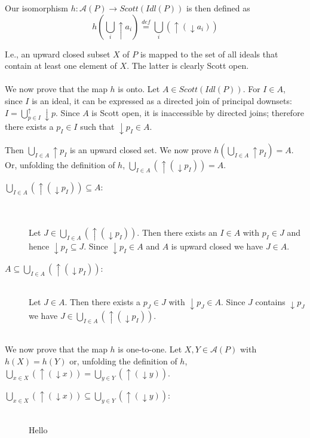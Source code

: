\documentclass{article}
\newcommand{\defeq}{\overset{\mathit{def}}{=}}
\begin{document}
Our isomorphism $h : \mathcal{A}(P) \to \mathit{Scott}(\mathit{Idl}(P))$ is then defined as
$$ h( \bigcup_i  \uparrow a_i ) \defeq \bigcup_i ( \uparrow (\downarrow a_i) )$$

I.e., an upward closed subset $X$ of $P$ is mapped to the set of all ideals that contain at least one element of $X$.
The latter is clearly Scott open.\\~\\
We now prove that the map $h$ is onto. Let $A \in \mathit{Scott}(\mathit{Idl}(P))$. For $I \in A$, since $I$ is an ideal, it can be expressed as a directed join of principal downsets: $I = \bigcup^{\uparrow}_{p \in I}\downarrow p$.
Since $A$ is Scott open, it is inaccessible by directed joins; therefore there exists a $p_I \in I$ such that 
$\downarrow p_I \in A$.  

Then $\bigcup_{I \in A} \uparrow p_I$ is an upward closed set. We now prove $h(\bigcup_{I \in A} \uparrow p_I)=A$. Or, unfolding the definition of $h$, $\bigcup_{I \in A} (\uparrow (\downarrow p_I) ) = A$. 

\begin{description}

\item[$\bigcup_{I \in A} (\uparrow (\downarrow p_I) ) \subseteq A$:]~\\~\\
Let $J \in \bigcup_{I \in A} (\uparrow (\downarrow p_I) )$. Then there exists an $I \in A$ with $p_I \in J$ and hence $\downarrow p_I \subseteq J$. Since $\downarrow p_I \in A$ and $A$ is upward closed we have $J \in A$.

\item[$A \subseteq \bigcup_{I \in A} (\uparrow (\downarrow p_I) )$:]~\\

Let $J \in A$. Then there exists a $p_J \in J$ with $\downarrow p_J \in A$. Since $J$ contains $\downarrow p_J$
we have $J \in \bigcup_{I \in A} (\uparrow (\downarrow p_I) )$.

\end{description}~\\
We now prove that the map $h$ is one-to-one. Let $X,Y \in \mathcal A(P)$ with $h(X) = h(Y)$ or, unfolding the
definition of $h$, $\bigcup_{x \in X} (\uparrow (\downarrow x)) = \bigcup_{y \in Y} (\uparrow (\downarrow y))$.

\begin{description}

\item[$\bigcup_{x \in X} (\uparrow (\downarrow x)) \subseteq \bigcup_{y \in Y} (\uparrow (\downarrow y))$:]~\\

Hello

\end{description}
\end{document}
